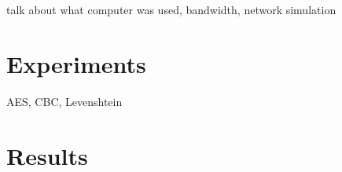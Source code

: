 talk about what computer was used, bandwidth, network simulation

\section{Experiments}
AES, CBC, Levenshtein

\section{Results}
























































